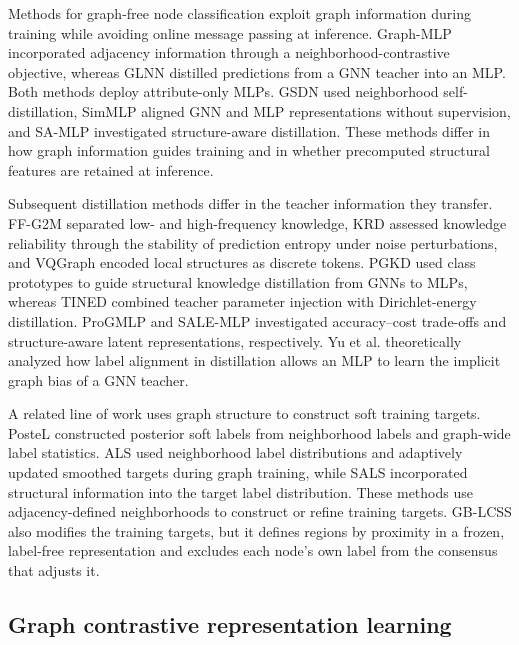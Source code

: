 \documentclass[10pt,letterpaper,nopreprintline]{elsarticle}
\theoremstyle{definition}
\theoremstyle{plain}
\begin{document}
Methods for graph-free node classification exploit graph information during training while avoiding online message passing at inference. Graph-MLP \cite{ref3} incorporated adjacency information through a neighborhood-contrastive objective, whereas GLNN \cite{ref4} distilled predictions from a GNN teacher into an MLP. Both methods deploy attribute-only MLPs. GSDN \cite{ref40} used neighborhood self-distillation, SimMLP \cite{ref41} aligned GNN and MLP representations without supervision, and SA-MLP \cite{ref44} investigated structure-aware distillation. These methods differ in how graph information guides training and in whether precomputed structural features are retained at inference.

Subsequent distillation methods differ in the teacher information they transfer. FF-G2M \cite{ref45} separated low- and high-frequency knowledge, KRD \cite{ref46} assessed knowledge reliability through the stability of prediction entropy under noise perturbations, and VQGraph \cite{ref47} encoded local structures as discrete tokens. PGKD \cite{ref48} used class prototypes to guide structural knowledge distillation from GNNs to MLPs, whereas TINED \cite{ref49} combined teacher parameter injection with Dirichlet-energy distillation. ProGMLP \cite{ref51} and SALE-MLP \cite{ref52} investigated accuracy--cost trade-offs and structure-aware latent representations, respectively. Yu et al. \cite{ref53} theoretically analyzed how label alignment in distillation allows an MLP to learn the implicit graph bias of a GNN teacher.

A related line of work uses graph structure to construct soft training targets. PosteL \cite{ref54} constructed posterior soft labels from neighborhood labels and graph-wide label statistics. ALS \cite{ref55} used neighborhood label distributions and adaptively updated smoothed targets during graph training, while SALS \cite{ref56} incorporated structural information into the target label distribution. These methods use adjacency-defined neighborhoods to construct or refine training targets. GB-LCSS also modifies the training targets, but it defines regions by proximity in a frozen, label-free representation and excludes each node's own label from the consensus that adjusts it.

\subsection{Graph contrastive representation learning}\label{sec:2.4}
\end{document}
